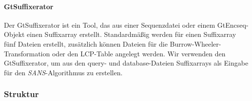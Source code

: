 \documentclass{article}
\begin{document}
\paragraph{GtSuffixerator}
Der GtSuffixerator ist ein Tool, das aus einer Sequenzdatei oder einem GtEncseq-Objekt einen Suffixarray erstellt. Standardmäßig werden für einen Suffixarray fünf Dateien erstellt, zusätzlich können Dateien für die Burrow-Wheeler-Transformation oder den LCP-Table angelegt werden. Wir verwenden den GtSuffixerator, um aus den query- und database-Dateien Suffixarrays als Eingabe für den \emph{SANS}-Algorithmus zu erstellen.

\subsubsection{Struktur}
\end{document}
